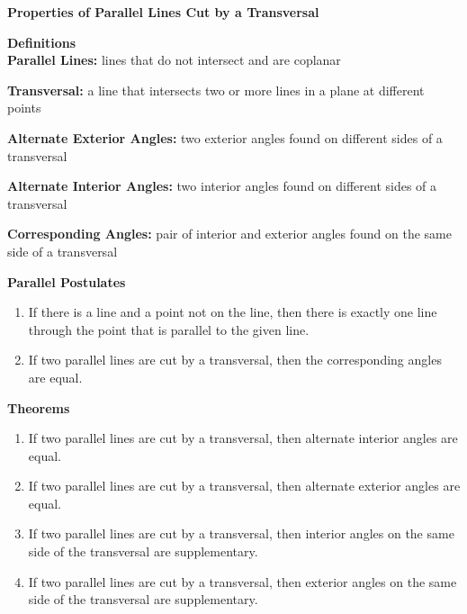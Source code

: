 \begin{center}
\textbf{Properties of Parallel Lines Cut by a Transversal 
}
\end{center}

\vspce

\textbf{Definitions} \\
\textbf{Parallel Lines:} lines that do not intersect and are coplanar

\textbf{Transversal:} a line that intersects two or more lines in a plane at different points

\textbf{Alternate Exterior Angles:} two exterior angles found on different sides of a transversal

\textbf{Alternate Interior Angles:} two interior angles found on different sides of a transversal

\textbf{Corresponding Angles:} pair of interior and exterior angles found on the same side of a transversal

\vspce 

\textbf{Parallel Postulates}
\begin{enumerate}[label = \arabic*. ]
\item If there is a line and a point not on the line, then there is exactly one line through the point that is
parallel to the given line.
\item If two parallel lines are cut by a transversal, then the corresponding angles are equal. 
\end{enumerate}   

\vspce 

\textbf{Theorems}
\begin{enumerate}[label = \arabic*. ]
\item If two parallel lines are cut by a transversal, then alternate interior angles are equal.
\item If two parallel lines are cut by a transversal, then alternate exterior angles are equal.
\item If two parallel lines are cut by a transversal, then interior angles on the same side of the transversal are supplementary.
\item If two parallel lines are cut by a transversal, then exterior angles on the same side of the transversal are supplementary.
\end{enumerate}  





